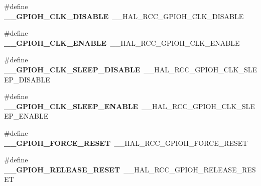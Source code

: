 \begin{DoxyCompactItemize}
\item 
\hypertarget{group___h_a_l___r_c_c___aliased_gad91af796c93891e05794ca2e567c5e19}{\#define {\bfseries \-\_\-\-\_\-\-G\-P\-I\-O\-H\-\_\-\-C\-L\-K\-\_\-\-D\-I\-S\-A\-B\-L\-E}~\-\_\-\-\_\-\-H\-A\-L\-\_\-\-R\-C\-C\-\_\-\-G\-P\-I\-O\-H\-\_\-\-C\-L\-K\-\_\-\-D\-I\-S\-A\-B\-L\-E}\label{group___h_a_l___r_c_c___aliased_gad91af796c93891e05794ca2e567c5e19}

\item 
\hypertarget{group___h_a_l___r_c_c___aliased_ga137644483fad343beaaa3da30fcb38dc}{\#define {\bfseries \-\_\-\-\_\-\-G\-P\-I\-O\-H\-\_\-\-C\-L\-K\-\_\-\-E\-N\-A\-B\-L\-E}~\-\_\-\-\_\-\-H\-A\-L\-\_\-\-R\-C\-C\-\_\-\-G\-P\-I\-O\-H\-\_\-\-C\-L\-K\-\_\-\-E\-N\-A\-B\-L\-E}\label{group___h_a_l___r_c_c___aliased_ga137644483fad343beaaa3da30fcb38dc}

\item 
\hypertarget{group___h_a_l___r_c_c___aliased_gae773715af6901369b9c070da4186c482}{\#define {\bfseries \-\_\-\-\_\-\-G\-P\-I\-O\-H\-\_\-\-C\-L\-K\-\_\-\-S\-L\-E\-E\-P\-\_\-\-D\-I\-S\-A\-B\-L\-E}~\-\_\-\-\_\-\-H\-A\-L\-\_\-\-R\-C\-C\-\_\-\-G\-P\-I\-O\-H\-\_\-\-C\-L\-K\-\_\-\-S\-L\-E\-E\-P\-\_\-\-D\-I\-S\-A\-B\-L\-E}\label{group___h_a_l___r_c_c___aliased_gae773715af6901369b9c070da4186c482}

\item 
\hypertarget{group___h_a_l___r_c_c___aliased_gae329633399e09af91b5fe095a3ff869e}{\#define {\bfseries \-\_\-\-\_\-\-G\-P\-I\-O\-H\-\_\-\-C\-L\-K\-\_\-\-S\-L\-E\-E\-P\-\_\-\-E\-N\-A\-B\-L\-E}~\-\_\-\-\_\-\-H\-A\-L\-\_\-\-R\-C\-C\-\_\-\-G\-P\-I\-O\-H\-\_\-\-C\-L\-K\-\_\-\-S\-L\-E\-E\-P\-\_\-\-E\-N\-A\-B\-L\-E}\label{group___h_a_l___r_c_c___aliased_gae329633399e09af91b5fe095a3ff869e}

\item 
\hypertarget{group___h_a_l___r_c_c___aliased_gaa91b10bb9316fff010da4ecd09f636d5}{\#define {\bfseries \-\_\-\-\_\-\-G\-P\-I\-O\-H\-\_\-\-F\-O\-R\-C\-E\-\_\-\-R\-E\-S\-E\-T}~\-\_\-\-\_\-\-H\-A\-L\-\_\-\-R\-C\-C\-\_\-\-G\-P\-I\-O\-H\-\_\-\-F\-O\-R\-C\-E\-\_\-\-R\-E\-S\-E\-T}\label{group___h_a_l___r_c_c___aliased_gaa91b10bb9316fff010da4ecd09f636d5}

\item 
\hypertarget{group___h_a_l___r_c_c___aliased_ga1a00e4a8dc1e9bfbf9c4396ff1344315}{\#define {\bfseries \-\_\-\-\_\-\-G\-P\-I\-O\-H\-\_\-\-R\-E\-L\-E\-A\-S\-E\-\_\-\-R\-E\-S\-E\-T}~\-\_\-\-\_\-\-H\-A\-L\-\_\-\-R\-C\-C\-\_\-\-G\-P\-I\-O\-H\-\_\-\-R\-E\-L\-E\-A\-S\-E\-\_\-\-R\-E\-S\-E\-T}\label{group___h_a_l___r_c_c___aliased_ga1a00e4a8dc1e9bfbf9c4396ff1344315}


\end{DoxyCompactItemize}

